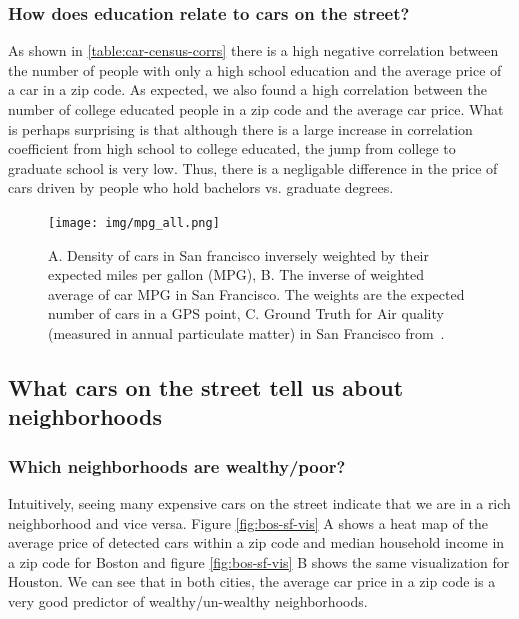 \documentclass[10pt,twocolumn,letterpaper]{article}
\begin{document}
\subsubsection{How does education relate to cars on the street?}
As shown in \ref{table:car-census-corrs} there is a high negative correlation between the number of people with only a high school education and the average price of a car in a zip code. As expected, we also found a high correlation between the number of college educated people in a zip code and the average car price. What is perhaps surprising is that although there is a large increase in correlation coefficient from high school to college educated, the jump from college to graduate school is very low. Thus, there is a negligable difference in the price of cars driven by people who hold bachelors vs. graduate degrees.

\begin{figure}[t]
\begin{center}
    \texttt{[image: img/mpg\_all.png]}
\end{center}
   \caption {A. Density of cars in San francisco inversely weighted by their expected miles per gallon (MPG), B. The inverse of weighted average of car MPG in San Francisco. The weights are the expected number of cars in a GPS point, C. Ground Truth for Air quality (measured in annual particulate matter) in San Francisco from~\cite{ground_air}.}
\label{fig:pollution}
\end{figure}

\subsection{What cars on the street tell us about neighborhoods}
\subsubsection{Which neighborhoods are wealthy/poor?}
Intuitively, seeing many expensive cars on the street indicate that we are in a rich neighborhood and vice versa. Figure \ref{fig:bos-sf-vis} A shows a heat map of the average price of detected cars within a zip code and median household income in a zip code for Boston and figure \ref{fig:bos-sf-vis} B shows the same visualization for Houston. We can see that in both cities, the average car price in a zip code is a very good predictor of wealthy/un-wealthy neighborhoods.
\end{document}
